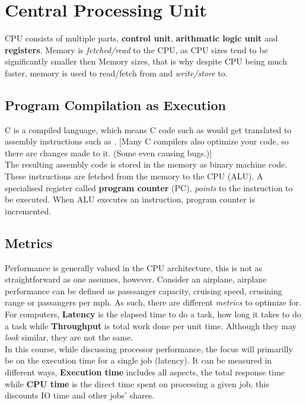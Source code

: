 \documentclass[11pt,a4paper,twocolumn]{book}
\begin{document}
\section{Central Processing Unit}

CPU consists of multiple parts, \textbf{control unit}, \textbf{arithmatic logic unit} and \textbf{registers}. Memory is \textit{fetched/read} to the CPU, as CPU sizes tend to be significantly smaller then Memory sizes, that is why despite CPU being much faster, memory is used to read/fetch from and \textit{write/store} to.

\subsection{Program Compilation as Execution}

C is a compiled language, which means C code such as  would get translated to assembly instructions such as . [Many C compilers also optimize your code, so there are changes made to it. (Some even causing bugs.)]\\

The resulting assembly code is stored in the memory as binary machine code. These instructions are fetched from the memory to the CPU (ALU). A specialised register called \textbf{program counter} (PC), \textit{points} to the instruction to be executed. When ALU executes an instruction, program counter is incremented.\\

\subsection{Metrics}

Performance is generally valued in the CPU architecture, this is not as straightforward as one assumes, however. Consider an airplane, airplane performance can be defined as passsanger capacity, cruising speed, crusining range or passangers per mph. As such, there are different \textit{metrics} to optimize for.\\

For computers, \textbf{Latency} is the elapsed time to do a task, how long it takes to do a task while \textbf{Throughput} is total work done per unit time. Although they may \textit{look} similar, they are not the same.\\

In this course, while discussing processor performance, the focus will primarilly be on the execution time for a single job (latency). It can be measured in different ways, \textbf{Execution time} includes all aspects, the total response time while \textbf{CPU time} is the direct time spent on processing a given job, this discounts IO time and other jobs' shares.
\end{document}
